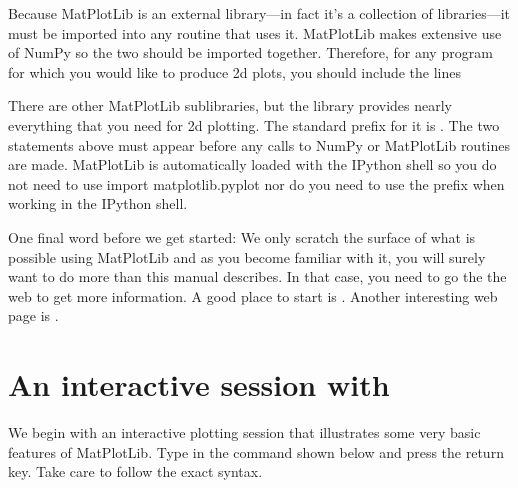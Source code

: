 \documentclass[letterpaper,10pt,english]{sphinxmanual}
\begin{document}
\sphinxAtStartPar
Because MatPlotLib is an external library—in fact it’s a collection of libraries—it must be imported into any routine that uses it.  MatPlotLib makes extensive use of NumPy so the two should be imported together.  Therefore, for any program for which you would like to produce 2\sphinxhyphen{}d plots, you should include the lines

\begin{sphinxVerbatim}[commandchars=\\\{\}]
   
   
\end{sphinxVerbatim}

\sphinxAtStartPar
There are other MatPlotLib sub\sphinxhyphen{}libraries, but the  library provides nearly everything that you need for 2\sphinxhyphen{}d plotting.  The standard prefix for it is .  The two statements above must appear before any calls to NumPy or MatPlotLib routines are made.  MatPlotLib is automatically loaded with the IPython shell so you do not need to use import matplotlib.pyplot nor do you need to use the  prefix when working in the IPython shell.

\sphinxAtStartPar
One final word before we get started: We only scratch the surface of what is possible using MatPlotLib and as you become familiar with it, you will surely want to do more than this manual describes.  In that case, you need to go the the web to get more information.  A good place to start is .  Another interesting web page is .


\section{An interactive session with }
\label{\detokenize{chap5/chap5_plot:an-interactive-session-with-pyplot}}
\ignorespaces 
\sphinxAtStartPar
We begin with an interactive plotting session that illustrates some very basic features of MatPlotLib.  Type in the  command shown below and press the return key.  Take care to follow the exact syntax.

\begin{sphinxVerbatim}[commandchars=\\\{\}]
\PYG{p}{[}\PYG{p}{]}
\PYG{p}{[}  \PYG{p}{]}
\end{sphinxVerbatim}
\end{document}
